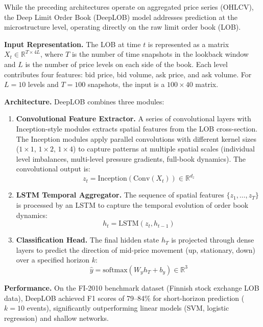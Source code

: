 \documentclass[conference]{IEEEtran}
\begin{document}
While the preceding architectures operate on aggregated price series (OHLCV), the Deep Limit Order Book (DeepLOB) model \cite{zhang2019deeplob} addresses prediction at the microstructure level, operating directly on the raw limit order book (LOB).

\textbf{Input Representation.} The LOB at time $t$ is represented as a matrix $X_t \in \mathbb{R}^{T \times 4L}$, where $T$ is the number of time snapshots in the lookback window and $L$ is the number of price levels on each side of the book. Each level contributes four features: bid price, bid volume, ask price, and ask volume. For $L = 10$ levels and $T = 100$ snapshots, the input is a $100 \times 40$ matrix.

\textbf{Architecture.} DeepLOB combines three modules:

\begin{enumerate}[nosep]
    \item \textbf{Convolutional Feature Extractor.} A series of convolutional layers with Inception-style modules extracts spatial features from the LOB cross-section. The Inception modules apply parallel convolutions with different kernel sizes ($1 \times 1$, $1 \times 2$, $1 \times 4$) to capture patterns at multiple spatial scales (individual level imbalances, multi-level pressure gradients, full-book dynamics). The convolutional output is:
    \begin{equation}
    z_t = \text{Inception}\!\left(\text{Conv}(X_t)\right) \in \mathbb{R}^{d_z}
    \end{equation}

    \item \textbf{LSTM Temporal Aggregator.} The sequence of spatial features $\{z_1, \ldots, z_T\}$ is processed by an LSTM to capture the temporal evolution of order book dynamics:
    \begin{equation}
    h_t = \text{LSTM}(z_t, h_{t-1})
    \end{equation}

    \item \textbf{Classification Head.} The final hidden state $h_T$ is projected through dense layers to predict the direction of mid-price movement (up, stationary, down) over a specified horizon $k$:
    \begin{equation}
    \hat{y} = \text{softmax}(W_y h_T + b_y) \in \mathbb{R}^3
    \end{equation}
\end{enumerate}

\textbf{Performance.} On the FI-2010 benchmark dataset (Finnish stock exchange LOB data), DeepLOB achieved F1 scores of 79--84\% for short-horizon prediction ($k = 10$ events), significantly outperforming linear models (SVM, logistic regression) and shallow networks.
\end{document}

